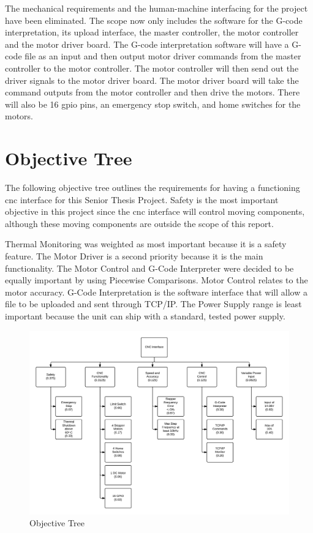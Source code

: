 The mechanical requirements and the human-machine interfacing for the project have been eliminated.
The scope now only includes the software for the G-code interpretation, its upload interface, the master controller, the motor controller and the motor driver board.
The G-code interpretation software will have a G-code file as an input and then output motor driver commands from the master controller to the motor controller.
The motor controller will then send out the driver signals to the motor driver board. 
The motor driver board will take the command outputs from the motor controller and then drive the motors. 
There will also be 16 \gls{gpio} pins, an emergency stop switch, and home switches for the motors. 

\section{Objective Tree}
The following objective tree outlines the requirements for having a functioning \gls{cnc} interface for this Senior Thesis Project.
Safety is the most important objective in this project since the \gls{cnc} interface will control moving components, although these moving components are outside the scope of this report.

Thermal Monitoring was weighted as most important because it is a safety feature.
The Motor Driver is a second priority because it is the main functionality.
The Motor Control and G-Code Interpreter were decided to be equally important by using Piecewise Comparisons.
Motor Control relates to the motor accuracy.
G-Code Interpretation is the software interface that will allow a file to be uploaded and sent through TCP/IP.
The Power Supply range is least important because the unit can ship with a standard, tested power supply.

\begin{figure}[H]
\centering
\includegraphics[width=1.0\textwidth]{otree.png}
\caption{Objective Tree}
\label{fig:o-tree}
\end{figure} 

